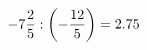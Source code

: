 \documentclass[preview]{standalone}
\begin{document}
\begin{align*}
-7 { 2 \over 5 }  :  \left( - { 12 \over 5 } \right) = 2.75
\end{align*}
\end{document}
